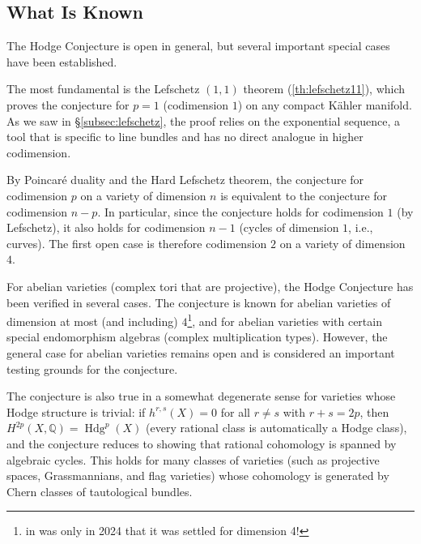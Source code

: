 \documentclass{article}
\newcommand{\Q}{\mathbb{Q}}
\begin{document}
\subsection{What Is Known}\label{subsec:known}

The Hodge Conjecture is open in general, but several important special cases
have been established.

The most fundamental is the Lefschetz $(1,1)$ theorem
(\ref{th:lefschetz11}), which proves the conjecture for $p = 1$ (codimension
$1$) on any compact K\"{a}hler manifold. As we saw in \S\ref{subsec:lefschetz},
the proof relies on the exponential sequence, a tool that is specific to line
bundles and has no direct analogue in higher codimension.

By Poincar\'{e} duality and the Hard Lefschetz theorem, the conjecture for
codimension $p$ on a variety of dimension $n$ is equivalent to the conjecture
for codimension $n - p$. In particular, since the conjecture holds for
codimension $1$ (by Lefschetz), it also holds for codimension $n - 1$ (cycles
of dimension $1$, i.e., curves). The first open case is therefore codimension
$2$ on a variety of dimension $4$.

For abelian varieties (complex tori that are projective), the Hodge Conjecture
has been verified in several cases. The conjecture is known for abelian
varieties of dimension at most (and including) $4$\footnote{in was only in 2024 that it was settled for dimension 4!}, and for abelian varieties with certain special endomorphism algebras
(complex multiplication types). However, the general case for abelian varieties
remains open and is considered an important testing grounds for
the conjecture.

The conjecture is also true in a somewhat degenerate sense for varieties whose
Hodge structure is trivial: if $h^{r,s}(X) = 0$ for all $r \neq s$ with
$r + s = 2p$, then $H^{2p}(X, \Q) = \operatorname{Hdg}^p(X)$ (every rational
class is automatically a Hodge class), and the conjecture reduces to showing
that rational cohomology is spanned by algebraic cycles. This holds for many
classes of varieties (such as projective spaces, Grassmannians, and flag
varieties) whose cohomology is generated by Chern classes of tautological
bundles.

\end{document}
